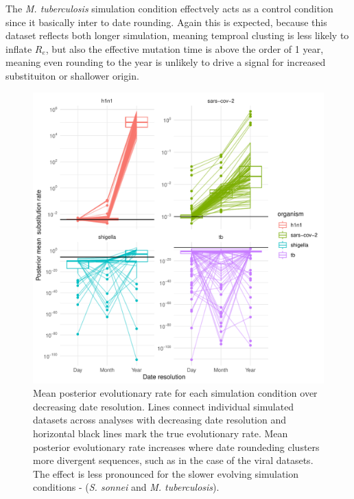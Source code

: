 \documentclass{article}
\begin{document}
\begin{spacing}{1.5}
The \textit{M. tuberculosis} simulation condition effectvely acts as a control condition since it basically inter to date rounding. Again this is expected, because this dataset reflects both longer simulation, meaning temproal clusting is less likely to inflate $R_e$, but also the effective mutation time is above the order of 1 year, meaning even rounding to the year is unlikely to drive a signal for increased substituiton or shallower origin.


\begin{figure}
    \centering
    \includegraphics{sim_clock_trajectory.pdf}
    \caption{Mean posterior evolutionary rate for each simulation condition over decreasing date resolution. Lines connect individual simulated datasets across analyses with decreasing date resolution and horizontal black lines mark the true evolutionary rate. Mean posterior evolutionary rate increases where date roundeding clusters more divergent sequences, such as in the case of the viral datasets. The effect is less pronounced for the slower evolving simulation conditions - (\textit{S. sonnei} and \textit{M. tuberculosis}).}
    \label{fig:simClock}
\end{figure}


\end{spacing}
\end{document}
